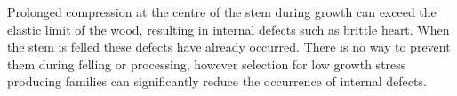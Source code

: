 Prolonged compression at the centre of the stem during growth can exceed the
elastic limit of the wood, resulting in internal defects such as brittle heart.
When the stem is felled these defects have already occurred. There is
no way to prevent them during felling or processing, however selection for low growth stress
producing families can significantly reduce the occurrence of internal
defects.